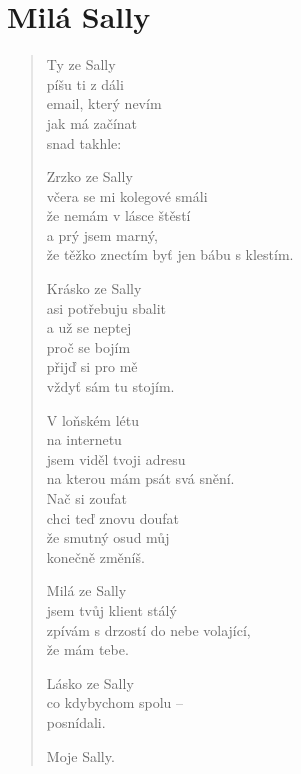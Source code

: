 \section{Milá Sally}

\thispagestyle{empty}

\begin{multicols}{2}
	
	
\begin{verse}		
	Ty ze Sally\\
	píšu ti z dáli\\
	email, který nevím\\
	jak má začínat\\
	snad takhle:
	
	Zrzko ze Sally\\
	včera se mi kolegové smáli\\
	že nemám v lásce štěstí\\
	a prý jsem marný,\\
	že těžko znectím byť jen bábu s klestím.
	
	Krásko ze Sally\\
	asi potřebuju sbalit\\
	a už se neptej\\
	proč se bojím\\
	přijď si pro mě\\
	vždyť sám tu stojím.
	
	V loňském létu\\
	na internetu\\
	jsem viděl tvoji adresu\\
	na kterou mám psát svá snění.\\
	Nač si zoufat\\
	chci teď znovu doufat\\
	že smutný osud můj\\
	konečně změníš.
	
	\columnbreak
	
	Milá ze Sally\\
	jsem tvůj klient stálý\\
	zpívám s drzostí do nebe volající,\\
	že mám tebe.
	
	Lásko ze Sally\\
	co kdybychom spolu -- \\
	posnídali.
	
	Moje Sally.
\end{verse}
	
	
\end{multicols}